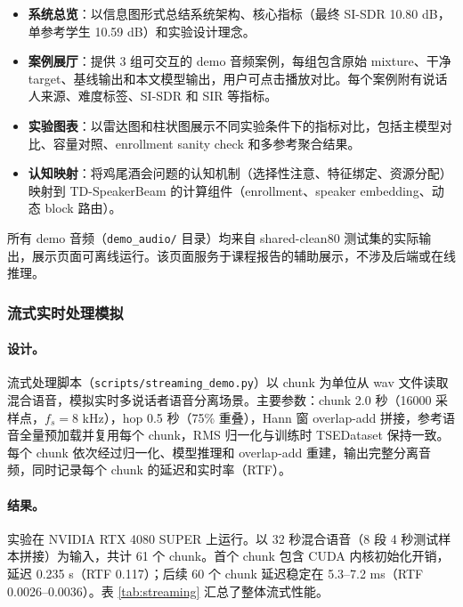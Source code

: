 \documentclass[UTF8,zihao=5,a4paper]{ctexart}
\begin{document}
\begin{itemize}
    \item \textbf{系统总览}：以信息图形式总结系统架构、核心指标（最终 SI-SDR 10.80 dB，单参考学生 10.59 dB）和实验设计理念。
    \item \textbf{案例展厅}：提供 3 组可交互的 demo 音频案例，每组包含原始 mixture、干净 target、基线输出和本文模型输出，用户可点击播放对比。每个案例附有说话人来源、难度标签、SI-SDR 和 SIR 等指标。
    \item \textbf{实验图表}：以雷达图和柱状图展示不同实验条件下的指标对比，包括主模型对比、容量对照、enrollment sanity check 和多参考聚合结果。
    \item \textbf{认知映射}：将鸡尾酒会问题的认知机制（选择性注意、特征绑定、资源分配）映射到 TD-SpeakerBeam 的计算组件（enrollment、speaker embedding、动态 block 路由）。
\end{itemize}

所有 demo 音频（\texttt{demo\_audio/} 目录）均来自 shared-clean80 测试集的实际输出，展示页面可离线运行。该页面服务于课程报告的辅助展示，不涉及后端或在线推理。

\subsubsection{流式实时处理模拟}

\paragraph{设计。}
流式处理脚本（\texttt{scripts/streaming\_demo.py}）以 chunk 为单位从 wav 文件读取混合语音，模拟实时多说话者语音分离场景。主要参数：chunk 2.0 秒（16000 采样点，$f_s = 8$ kHz），hop 0.5 秒（75\% 重叠），Hann 窗 overlap-add 拼接，参考语音全量预加载并复用每个 chunk，RMS 归一化与训练时 TSEDataset 保持一致。每个 chunk 依次经过归一化、模型推理和 overlap-add 重建，输出完整分离音频，同时记录每个 chunk 的延迟和实时率（RTF）。

\paragraph{结果。}
实验在 NVIDIA RTX 4080 SUPER 上运行。以 32 秒混合语音（8 段 4 秒测试样本拼接）为输入，共计 61 个 chunk。首个 chunk 包含 CUDA 内核初始化开销，延迟 0.235 s（RTF 0.117）；后续 60 个 chunk 延迟稳定在 5.3--7.2 ms（RTF 0.0026--0.0036）。表 \ref{tab:streaming} 汇总了整体流式性能。
\end{document}
